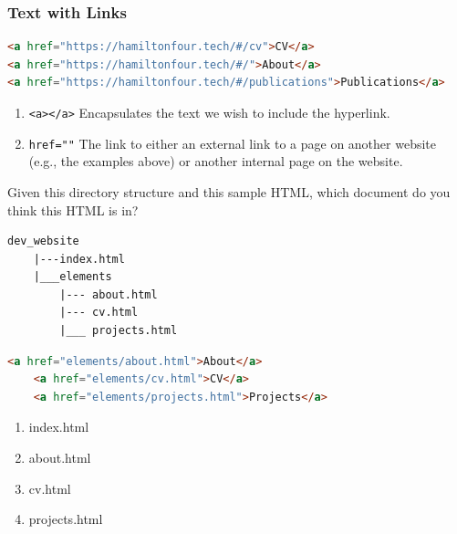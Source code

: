 \documentclass{beamer}
\begin{document}
%
%
\begin{frame}[fragile]
    \frametitle{Text with Links}
    \begin{lstlisting}[language=html, basicstyle=\scriptsize]
<a href="https://hamiltonfour.tech/#/cv">CV</a>
<a href="https://hamiltonfour.tech/#/">About</a>
<a href="https://hamiltonfour.tech/#/publications">Publications</a>
    \end{lstlisting} 
    \hfill
    \begin{enumerate}[A]
        \item \lstinline|<a></a>| \textrightarrow Encapsulates the text we wish to include the hyperlink.
        \item \lstinline|href=""| \textrightarrow The link to either an external link to a page on another website (e.g., the examples above) or another internal page on the website. 
    \end{enumerate}
\end{frame}

%
%
\begin{frame}[fragile]
    Given this directory structure and this sample HTML, which document do you think this HTML is in?\\
    \begin{minipage}{0.68\textwidth}
    \begin{lstlisting}[autogobble]
    dev_website
    |---index.html
    |___elements
        |--- about.html
        |--- cv.html
        |___ projects.html
        \end{lstlisting} 
        \hfill
        \begin{lstlisting}[language=html,autogobble, basicstyle=\scriptsize]
    <a href="elements/about.html">About</a>
    <a href="elements/cv.html">CV</a>
    <a href="elements/projects.html">Projects</a>
        \end{lstlisting} 
    \end{minipage}
    \hfill
    \begin{minipage}{0.25\textwidth}
        \begin{enumerate}[A]
            \item index.html
            \item about.html
            \item cv.html
            \item projects.html
        \end{enumerate}
    \end{minipage}
\end{frame}
\end{document}
